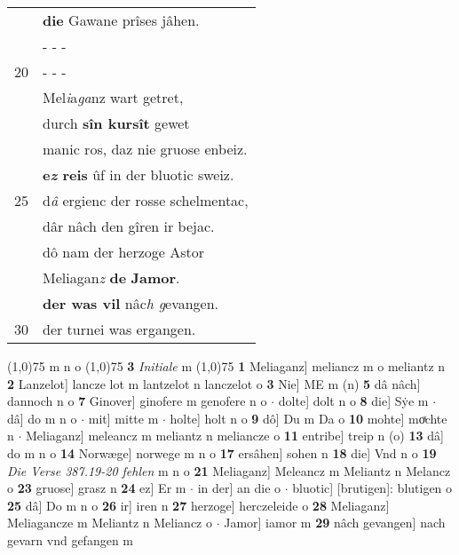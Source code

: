 \documentclass[8pt,a4paper,notitlepage]{article}
\begin{document}
\begin{table}[ht]
\begin{minipage}[t]{0.5\linewidth}
\begin{tabular}{rl}
 & \textbf{die} Gawane prîses jâhen.\\ 
 & \multicolumn{1}{l}{ - - - }\\ 
20 & \multicolumn{1}{l}{ - - - }\\ 
 & Mel\textit{i}a\textit{ga}nz wart getret,\\ 
 & durch \textbf{sîn kursît} gewet\\ 
 & manic ros, daz nie gruose enbeiz.\\ 
 & \textbf{e\textit{z} reis} ûf in der bluotic sweiz.\\ 
25 & d\textit{â} ergienc der rosse schelmentac,\\ 
 & dâr nâch den gîren ir bejac.\\ 
 & dô nam der herzoge Astor\\ 
 & Meliagan\textit{z} \textbf{de} \textbf{Jamor}.\\ 
 & \textbf{der was vil} nâc\textit{h g}evangen.\\ 
30 & der turnei was ergangen.\\ 
\end{tabular}
\scriptsize
\line(1,0){75} \newline
m n o \newline
\line(1,0){75} \newline
\textbf{3} \textit{Initiale} m  \newline
\line(1,0){75} \newline
\textbf{1} Meliaganz] meliancz m o meliantz n \textbf{2} Lanzelot] lancze lot m lantzelot n lanczelot o \textbf{3} Nie] ME m (n) \textbf{5} dâ nâch] dannoch n o \textbf{7} Ginover] ginofere m genofere n o  $\cdot$ dolte] dolt n o \textbf{8} die] Sẏe m  $\cdot$ dâ] do m n o  $\cdot$ mit] mitte m  $\cdot$ holte] holt n o \textbf{9} dô] Du m Da o \textbf{10} mohte] moͯchte n  $\cdot$ Meliaganz] meleancz m meliantz n meliancze o \textbf{11} entribe] treip n (o) \textbf{13} dâ] do m n o \textbf{14} Norwæge] norwege m n o \textbf{17} ersâhen] sohen n \textbf{18} die] Vnd n o \textbf{19} \textit{Die Verse 387.19-20 fehlen} m n o  \textbf{21} Meliaganz] Meleancz m Meliantz n Melancz o \textbf{23} gruose] grasz n \textbf{24} ez] Er m  $\cdot$ in der] an die o  $\cdot$ bluotic] [brutigen]: blutigen o \textbf{25} dâ] Do m n o \textbf{26} ir] iren n \textbf{27} herzoge] herczeleide o \textbf{28} Meliaganz] Meliagancze m Meliantz n Meliancz o  $\cdot$ Jamor] iamor m \textbf{29} nâch gevangen] nach gevarn vnd gefangen m \newline
\end{minipage}
\end{table}
\end{document}
